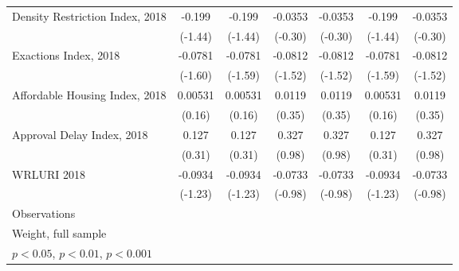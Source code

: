 \begin{table}[htbp]
\begin{tabular}{l*{6}{c}}
Density Restriction Index, 2018&      -0.199         &      -0.199         &     -0.0353         &     -0.0353         &      -0.199         &     -0.0353         \\
                    &     (-1.44)         &     (-1.44)         &     (-0.30)         &     (-0.30)         &     (-1.44)         &     (-0.30)         \\
\addlinespace
Exactions Index, 2018&     -0.0781         &     -0.0781         &     -0.0812         &     -0.0812         &     -0.0781         &     -0.0812         \\
                    &     (-1.60)         &     (-1.59)         &     (-1.52)         &     (-1.52)         &     (-1.59)         &     (-1.52)         \\
\addlinespace
Affordable Housing Index, 2018&     0.00531         &     0.00531         &      0.0119         &      0.0119         &     0.00531         &      0.0119         \\
                    &      (0.16)         &      (0.16)         &      (0.35)         &      (0.35)         &      (0.16)         &      (0.35)         \\
\addlinespace
Approval Delay Index, 2018&       0.127         &       0.127         &       0.327         &       0.327         &       0.127         &       0.327         \\
                    &      (0.31)         &      (0.31)         &      (0.98)         &      (0.98)         &      (0.31)         &      (0.98)         \\
\addlinespace
WRLURI 2018         &     -0.0934         &     -0.0934         &     -0.0733         &     -0.0733         &     -0.0934         &     -0.0733         \\
                    &     (-1.23)         &     (-1.23)         &     (-0.98)         &     (-0.98)         &     (-1.23)         &     (-0.98)         \\
\midrule
Observations        &                     &                     &                     &                     &                     &                     \\
\bottomrule
\multicolumn{7}{l}{\footnotesize Weight, full sample}\\
\multicolumn{7}{l}{\footnotesize \sym{*} \(p<0.05\), \sym{**} \(p<0.01\), \sym{***} \(p<0.001\)}\\
\end{tabular}
\end{table}
